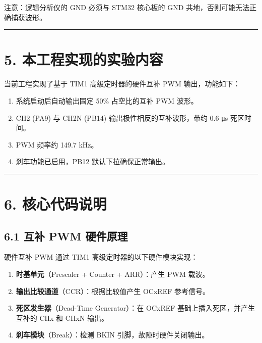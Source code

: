 \documentclass[
  chinese,
  UTF8,
  oneside,
  openany]{ctexbook}
\providecommand{\tightlist}{%
  \setlength{\itemsep}{0pt}\setlength{\parskip}{0pt}}
\begin{document}
注意：逻辑分析仪的 GND 必须与 STM32 核心板的 GND
共地，否则可能无法正确捕获波形。

\begin{center}\rule{0.5\linewidth}{0.5pt}\end{center}

\section{5.
本工程实现的实验内容}\label{ux672cux5de5ux7a0bux5b9eux73b0ux7684ux5b9eux9a8cux5185ux5bb9-3}

当前工程实现了基于 TIM1 高级定时器的硬件互补 PWM 输出，功能如下：

\begin{enumerate}
\def\labelenumi{\arabic{enumi}.}
\tightlist
\item
  系统启动后自动输出固定 50\% 占空比的互补 PWM 波形。
\item
  CH2 (PA9) 与 CH2N (PB14) 输出极性相反的互补波形，带约 0.6 μs
  死区时间。
\item
  PWM 频率约 149.7 kHz。
\item
  刹车功能已启用，PB12 默认下拉确保正常输出。
\end{enumerate}

\begin{center}\rule{0.5\linewidth}{0.5pt}\end{center}

\section{6. 核心代码说明}\label{ux6838ux5fc3ux4ee3ux7801ux8bf4ux660e-5}

\subsection{6.1 互补 PWM
硬件原理}\label{ux4e92ux8865-pwm-ux786cux4ef6ux539fux7406}

硬件互补 PWM 通过 TIM1 高级定时器的以下硬件模块实现：

\begin{enumerate}
\def\labelenumi{\arabic{enumi}.}
\tightlist
\item
  \textbf{时基单元}（Prescaler + Counter + ARR）：产生 PWM 载波。
\item
  \textbf{输出比较通道}（CCR）：根据比较值产生 OCxREF 参考信号。
\item
  \textbf{死区发生器}（Dead-Time Generator）：在 OCxREF
  基础上插入死区，并产生互补的 CHx 和 CHxN 输出。
\item
  \textbf{刹车模块}（Break）：检测 BKIN 引脚，故障时硬件关闭输出。
\end{enumerate}
\end{document}
